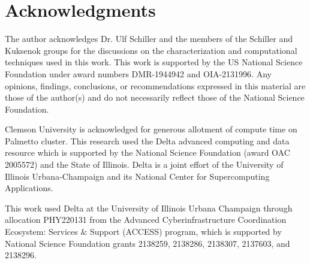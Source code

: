 \section{Acknowledgments}

The author acknowledges Dr. Ulf Schiller and the members of the Schiller and Kuksenok groups for the discussions on the characterization and computational techniques used in this work. This work is supported by the US National Science Foundation under award numbers DMR-1944942 and OIA-2131996. Any opinions, findings, conclusions, or recommendations expressed in this material are those of the author(s) and do not necessarily reflect those of the National Science Foundation.  

Clemson University is acknowledged for generous allotment of compute time on Palmetto cluster. This research used the Delta advanced computing and data resource which is supported by the National Science Foundation (award OAC 2005572) and the State of Illinois. Delta is a joint effort of the University of Illinois Urbana-Champaign and its National Center for Supercomputing Applications. 

This work used Delta at the University of Illinois Urbana Champaign through allocation PHY220131 from the Advanced Cyberinfrastructure Coordination Ecosystem: Services $\&$ Support (ACCESS) program, which is supported by National Science Foundation grants 2138259, 2138286, 2138307, 2137603, and 2138296. 
